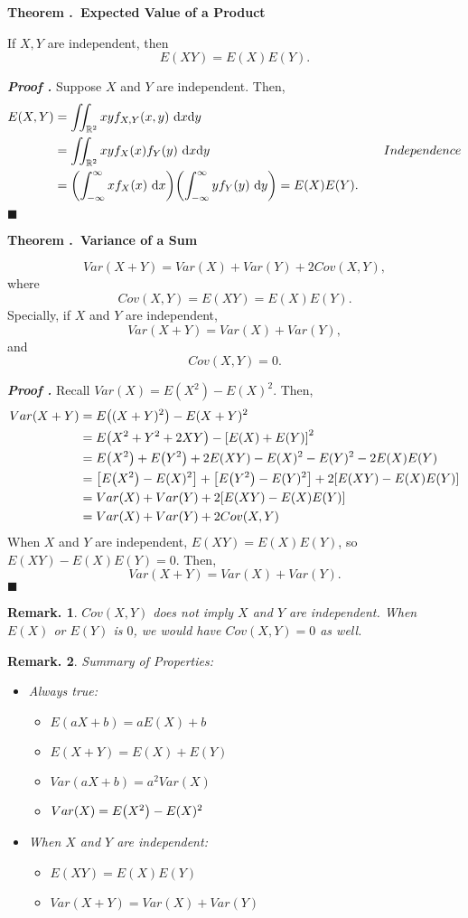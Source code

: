 \documentclass[12pt, a4paper]{article}
\newcounter{index}[subsection]
\newenvironment*{thm}[1]{\begin{tcolorbox}\par\noindent\textbf{Theorem \thesubsection.\stepcounter{index}\theindex\ #1} \par}{\par\end{tcolorbox}}
\newcounter{nprf}[subsection]
\newenvironment*{prf}{\par\indent\textbf{\textit{Proof \stepcounter{nprf}\thenprf.}}}{\hfill$\blacksquare$\par}
\newtheorem*{rmk}{Remark.}
\def\R{\mathbb{R}}
\def\d{\mathrm{d}}
\begin{document}
\begin{thm}{Expected Value of a Product}
	If $X,Y$ are independent, then \[E(XY)=E(X)E(Y).\]
\end{thm}
\begin{prf}
	Suppose $X$ and $Y$ are independent. Then, \begin{align*}E(X,Y)&=\iint_{\R^2}xyf_{X,Y}(x,y)\ \d{x}\d{y}\\&=\iint_{\R^2}xyf_X(x)f_Y(y)\ \d{x}\d{y}&\quad Independence\\&=\qty(\int_{-\infty}^\infty xf_X(x)\ \d{x})\qty(\int_{-\infty}^\infty yf_Y(y)\ \d{y})=E(X)E(Y).\end{align*}	
\end{prf}
\begin{thm}{Variance of a Sum}
	\[Var(X+Y)=Var(X)+Var(Y)+2Cov(X,Y),\] where \[Cov(X,Y)=E(XY)=E(X)E(Y).\] Specially, if $X$ and $Y$ are independent, \[Var(X+Y)=Var(X)+Var(Y),\] and \[Cov(X,Y)=0.\]
\end{thm}
\begin{prf}
	Recall $Var(X)=E(X^2)-E(X)^2$. Then, \begin{align*}Var(X+Y)&=E\qty((X+Y)^2)-E(X+Y)^2\\&=E\qty(X^2+Y^2+2XY)-\qty[E(X)+E(Y)]^2\\&=E\qty(X^2)+E\qty(Y^2)+2E(XY)-E(X)^2-E(Y)^2-2E(X)E(Y)\\&=\qty[E\qty(X^2)-E(X)^2]+\qty[E\qty(Y^2)-E(Y)^2]+2\qty[E(XY)-E(X)E(Y)]\\&=Var(X)+Var(Y)+2\qty[E(XY)-E(X)E(Y)]\\&=Var(X)+Var(Y)+2Cov(X,Y)\end{align*} When $X$ and $Y$ are independent, $E(XY)=E(X)E(Y)$, so $E(XY)-E(X)E(Y)=0$. Then, \[Var(X+Y)=Var(X)+Var(Y).\]
\end{prf}
\begin{rmk}
	$Cov(X,Y)$ does not imply $X$ and $Y$ are independent. When $E(X)$ or $E(Y)$ is $0$, we would have $Cov(X,Y)=0$ as well. 	
\end{rmk}
\begin{rmk}
	Summary of Properties: 
	\begin{itemize}
		\item Always true: 
		\begin{itemize}
			\item $E(aX+b)=aE(X)+b$
			\item $E(X+Y)=E(X)+E(Y)$
			\item $Var(aX+b)=a^2Var(X)$
			\item $Var(X)=E\qty(X^2)-E(X)^2$
		\end{itemize}
		\item When $X$ and $Y$ are independent: 
		\begin{itemize}
			\item $E(XY)=E(X)E(Y)$
			\item $Var(X+Y)=Var(X)+Var(Y)$
		\end{itemize}
	\end{itemize}	
\end{rmk}
\end{document}
